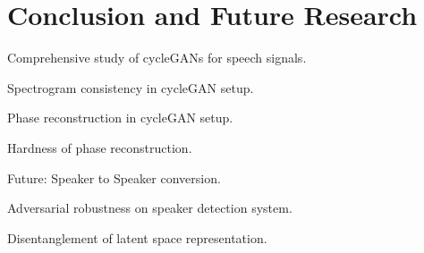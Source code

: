 \chapter{Conclusion and Future Research}
\label{ch:conclusion}

Comprehensive study of cycleGANs for speech signals.

Spectrogram consistency in cycleGAN setup.

Phase reconstruction in cycleGAN setup.

Hardness of phase reconstruction.


Future:
Speaker to Speaker conversion.

Adversarial robustness on speaker detection system.

Disentanglement of latent space representation.